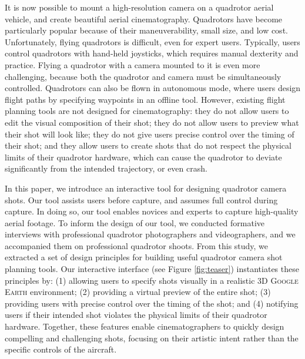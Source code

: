 
It is now possible to mount a high-resolution camera on a quadrotor aerial vehicle, and create beautiful aerial cinematography.
Quadrotors have become particularly popular because of their maneuverability, small size, and low cost.
Unfortunately, flying quadrotors is difficult, even for expert users.
Typically, users control quadrotors with hand-held joysticks, which requires manual dexterity and practice.
Flying a quadrotor with a camera mounted to it is even more challenging, because both the quadrotor and camera must be simultaneously controlled. 
Quadrotors can also be flown in autonomous mode, where users design flight paths by specifying waypoints in an offline tool. 
However, existing flight planning tools are not designed for cinematography: they do not allow users to edit the visual composition of their shot; they do not allow users to preview what their shot will look like; they do not give users precise control over the timing of their shot; and they allow users to create shots that do not respect the physical limits of their quadrotor hardware, which can cause the quadrotor to deviate significantly from the intended trajectory, or even crash.

In this paper, we introduce an interactive tool for  designing quadrotor camera shots. Our tool assists users before capture, and assumes full control during capture.
In doing so, our tool enables novices and experts to capture high-quality aerial footage.
To inform the design of our tool, we conducted formative interviews with professional quadrotor photographers and videographers, and we accompanied them on professional quadrotor shoots.
From this study, we extracted a set of design principles for building useful quadrotor camera shot planning tools. 
Our interactive interface (see Figure \ref{fig:teaser}) instantiates these principles by: (1) allowing users to specify shots visually in a realistic 3D \textsc{Google Earth} environment; (2) providing a virtual preview of the entire shot; (3) providing users with precise control over the timing of the shot; and (4) notifying users if their intended shot violates the physical limits of their quadrotor hardware.
Together, these features enable cinematographers to quickly design compelling and challenging shots, focusing on their artistic intent rather than the specific controls of the aircraft. 

